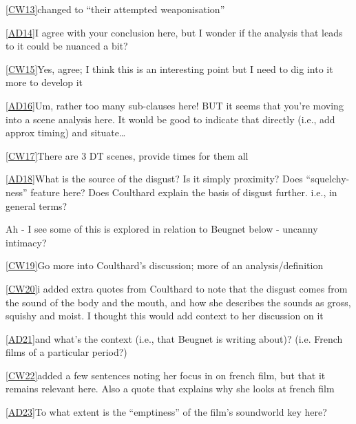 \href{applewebdata://3A1D666A-D52A-46D2-8C90-343A1EE58F85\#_msoanchor_13}{[CW13]}changed to “their attempted weaponisation”

\href{applewebdata://3A1D666A-D52A-46D2-8C90-343A1EE58F85\#_msoanchor_14}{[AD14]}I agree with your conclusion here, but I wonder if the analysis that leads to it could be nuanced a bit?

\href{applewebdata://3A1D666A-D52A-46D2-8C90-343A1EE58F85\#_msoanchor_15}{[CW15]}Yes, agree; I think this is an interesting point but I need to dig into it more to develop it

\href{applewebdata://3A1D666A-D52A-46D2-8C90-343A1EE58F85\#_msoanchor_16}{[AD16]}Um, rather too many sub-clauses here! BUT it seems that you’re moving into a scene analysis here. It would be good to indicate that directly (i.e., add approx timing) and situate…

\href{applewebdata://3A1D666A-D52A-46D2-8C90-343A1EE58F85\#_msoanchor_17}{[CW17]}There are 3 DT scenes, provide times for them all

\href{applewebdata://3A1D666A-D52A-46D2-8C90-343A1EE58F85\#_msoanchor_18}{[AD18]}What is the source of the disgust? Is it simply proximity? Does “squelchy-ness” feature here? Does Coulthard explain the basis of disgust further. i.e., in general terms? 

Ah - I see some of this is explored in relation to Beugnet below - uncanny intimacy?

\href{applewebdata://3A1D666A-D52A-46D2-8C90-343A1EE58F85\#_msoanchor_19}{[CW19]}Go more into Coulthard’s discussion; more of an analysis/definition

\href{applewebdata://3A1D666A-D52A-46D2-8C90-343A1EE58F85\#_msoanchor_20}{[CW20]}i added extra quotes from Coulthard to note that the disgust comes from the sound of the body and the mouth, and how she describes the sounds as gross, squishy and moist. I thought this would add context to her discussion on it 

\href{applewebdata://3A1D666A-D52A-46D2-8C90-343A1EE58F85\#_msoanchor_21}{[AD21]}and what’s the context (i.e., that Beugnet is writing about)? (i.e. French films of a particular period?) 

 \href{applewebdata://3A1D666A-D52A-46D2-8C90-343A1EE58F85\#_msoanchor_22}{[CW22]}added a few sentences noting her focus in on french film, but that it remains relevant here. Also a quote that explains why she looks at french film

\href{applewebdata://3A1D666A-D52A-46D2-8C90-343A1EE58F85\#_msoanchor_23}{[AD23]}To what extent is the “emptiness” of the film’s soundworld key here? 
